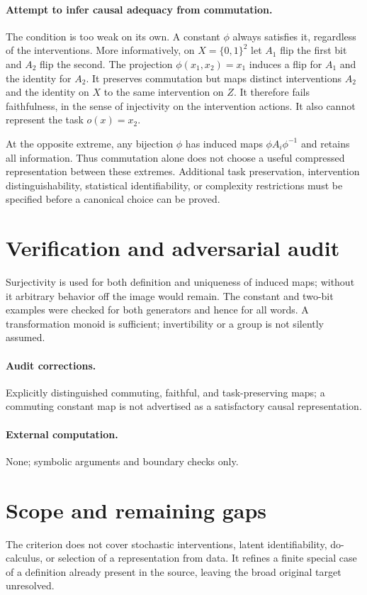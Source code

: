 \documentclass[11pt]{article}
\begin{document}
\paragraph{Attempt to infer causal adequacy from commutation.}
The condition is too weak on its own. A constant $\phi$ always satisfies it, regardless of the interventions. More informatively, on $X=\{0,1\}^2$ let $A_1$ flip the first bit and $A_2$ flip the second. The projection $\phi(x_1,x_2)=x_1$ induces a flip for $A_1$ and the identity for $A_2$. It preserves commutation but maps distinct interventions $A_2$ and the identity on $X$ to the same intervention on $Z$. It therefore fails faithfulness, in the sense of injectivity on the intervention actions. It also cannot represent the task $o(x)=x_2$.

At the opposite extreme, any bijection $\phi$ has induced maps $\phi A_i\phi^{-1}$ and retains all information. Thus commutation alone does not choose a useful compressed representation between these extremes. Additional task preservation, intervention distinguishability, statistical identifiability, or complexity restrictions must be specified before a canonical choice can be proved.
\section{Verification and adversarial audit}
Surjectivity is used for both definition and uniqueness of induced maps; without it arbitrary behavior off the image would remain. The constant and two-bit examples were checked for both generators and hence for all words. A transformation monoid is sufficient; invertibility or a group is not silently assumed.
\paragraph{Audit corrections.} Explicitly distinguished commuting, faithful, and task-preserving maps; a commuting constant map is not advertised as a satisfactory causal representation.
\paragraph{External computation.} None; symbolic arguments and boundary checks only.
\section{Scope and remaining gaps}
The criterion does not cover stochastic interventions, latent identifiability, do-calculus, or selection of a representation from data. It refines a finite special case of a definition already present in the source, leaving the broad original target unresolved.
\end{document}
